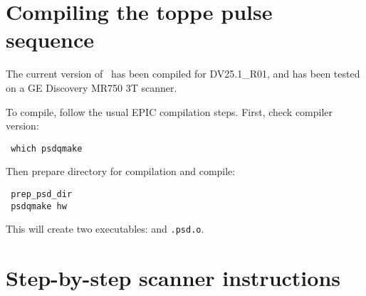 \section{Compiling the toppe pulse sequence}

The current version of \toppe~has been compiled for DV25.1\_R01, and has been tested on a GE Discovery MR750 3T scanner.

To compile, follow the usual EPIC compilation steps.
First, check compiler version:
\vspace{-10pt}
\begin{lstlisting}
 which psdqmake
\end{lstlisting}

Then prepare directory for compilation and compile:
\vspace{-10pt}
\begin{lstlisting}
 prep_psd_dir
 psdqmake hw
\end{lstlisting}
This will create two executables: {\tt \psdname} and {\tt \psdname.psd.o}.




\section{Step-by-step scanner instructions}

